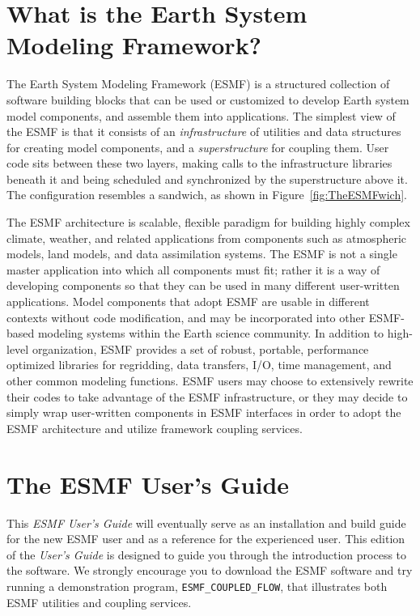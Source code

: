 
\section{What is the Earth System Modeling Framework?}

The Earth System Modeling Framework (ESMF) is a structured collection of 
software building blocks that can be used or customized to develop 
Earth system model components, and assemble them into applications.  
The simplest view of the ESMF is that it consists of an {\it infrastructure} 
of utilities and data structures for creating 
model components, and a {\it superstructure} for coupling them.  
User code sits between these two layers, making calls to the infrastructure
libraries beneath it and being scheduled and synchronized by the 
superstructure above it.  The configuration resembles a sandwich, as
shown in Figure~\ref{fig:TheESMFwich}.

The ESMF architecture is scalable, flexible paradigm for building highly 
complex climate, weather, and related applications from components such
as atmospheric models, land models, and data assimilation systems.  The 
ESMF is not a single master application into which all components must fit; 
rather it is a way of developing components so that they can be used 
in many different user-written applications.  Model components that adopt 
ESMF are usable in different contexts without code modification, and may be
incorporated into other ESMF-based modeling systems within the Earth 
science community.  In addition to high-level organization, ESMF provides 
a set of robust, portable, performance optimized libraries for regridding, 
data transfers, I/O, time management, and other common modeling functions.  
ESMF users may choose to extensively rewrite their codes to take advantage 
of the ESMF infrastructure, or they may decide to simply wrap user-written 
components in ESMF interfaces in order to adopt the ESMF architecture and 
utilize framework coupling services.

\section{The ESMF User's Guide}

This {\it ESMF User's Guide} will eventually serve as an installation
and build guide for
the new ESMF user and as a reference for the experienced user.  This
edition of the {\it User's Guide} is designed to guide you through the
introduction process to the software.  We strongly encourage you to
download the ESMF software and try running a demonstration program, 
{\tt ESMF\_COUPLED\_FLOW}, that illustrates both ESMF utilities and 
coupling services.

